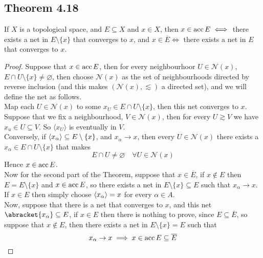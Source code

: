 \documentclass[../../main.tex]{subfiles}
\begin{document}
\subsection{Theorem 4.18}
\begin{wts}
If $X$ is a topological space, and $E\subseteq X$ and $x\in X$, then $x\in\operatorname{acc}{E}\iff$ there exists a net in $E\setminus\{x\}$ that converges to $x$, and $x\in \overline{E}\iff$ there exists a net in $E$ that converges to $x$.
\end{wts}
\newcommand{\nx}{\mathcal{N}(x)} %
\begin{proof}
Suppose that $x\in\operatorname{acc}{E}$, then for every neighbourhoor $U\in\mathcal{N}(x)$, $E\cap U\setminus\{x\}\neq\varnothing$, then choose $\mathcal{N}(x)$ as the set of neighbourhoods directed by reverse inclusion (and this makes $(\mathcal{N}(x),\lesssim)$ a directed set), and we will define the net as follows.\\

Map each $U\in \mathcal{N}(x)$ to some $x_U\in E\cap U\setminus\{x\}$, then this net converges to $x$. Suppose that we fix a neighbourhood, $V\in\nx$, then for every $U\gtrsim V$ we have $x_u\in U\subseteq V$. So $\langle x_U \rangle$ is eventually in $V$.\\

Conversely, if $\langle {x_\alpha} \rangle\subseteq E\setminus\{x\}$, and $x_\alpha\to x$, then every $U\in\nx$ there exists a $x_\alpha\in E\cap U\setminus\{x\}$ that makes
\[
E\cap U\neq \varnothing\quad \forall U\in\nx
\]
Hence $x\in\operatorname{acc}{E}$.\\

Now for the second part of the Theorem, suppose that $x\in\overline{E}$, if $x\notin E$ then $E = E\setminus\{x\}$ and $x\in\operatorname{acc}{E}$, so there exists a net in $E\setminus\{x\}\subseteq E$ such that $x_\alpha\to x$. If $x\in E$ then simply choose $\langle {x_\alpha} \rangle=x$ for every $\alpha\in A$.\\

Now, suppose that there is a net that converges to $x$, and this net $\abracket{x_\alpha}\subseteq E$, if $x\in E$ then there is nothing to prove, since $E\subseteq\overline{E}$, so suppose that $x\notin E$, then there exists a net in $E\setminus\{x\}=E$ such that 
\[
x_\alpha\to x\implies x\in\operatorname{acc}{E}\subseteq\overline{E}
\]
\end{proof}
\end{document}
